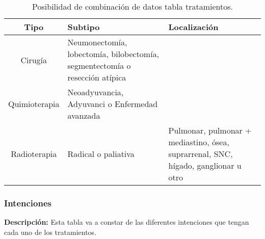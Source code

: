 \begin{longtable}{|c |p{5cm} |p{5.7cm} |}
\caption{Posibilidad de combinación de datos tabla tratamientos.}\\
\hline
\textbf{Tipo} & \textbf{Subtipo} & \textbf{Localización}\\ \hline
Cirugía & Neumonectomía, lobectomía, bilobectomía, segmentectomía o resección atípica & \\ \hline
Quimioterapia & Neoadyuvancia, Adyuvanci o Enfermedad avanzada & \\ \hline
Radioterapia & Radical o paliativa & Pulmonar, pulmonar + mediastino,  ósea, suprarrenal, SNC, hígado, ganglionar u otro\\ \hline
\end{longtable}

\subsubsection{Intenciones}

\textbf{Descripción:} Esta tabla va a constar de las diferentes intenciones que tengan cada uno de los tratamientos.

